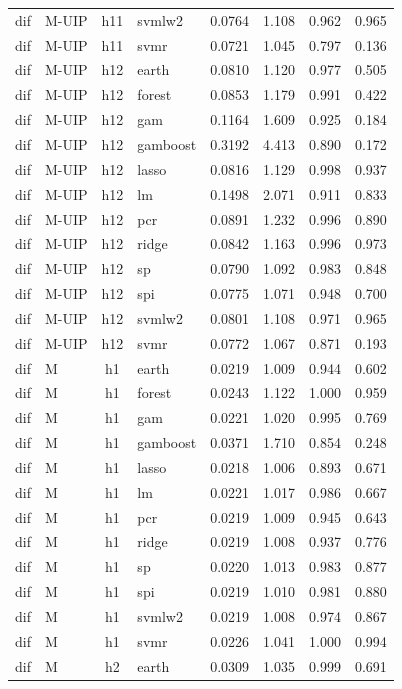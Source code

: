 \begin{ThreePartTable}
\begin{longtable}[t]{llclcccc}
dif & M-UIP & h11 & svmlw2 & 0.0764 & 1.108 & 0.962 & 0.965\\
dif & M-UIP & h11 & svmr & 0.0721 & 1.045 & 0.797 & 0.136\\
\addlinespace
dif & M-UIP & h12 & earth & 0.0810 & 1.120 & 0.977 & 0.505\\
dif & M-UIP & h12 & forest & 0.0853 & 1.179 & 0.991 & 0.422\\
dif & M-UIP & h12 & gam & 0.1164 & 1.609 & 0.925 & 0.184\\
dif & M-UIP & h12 & gamboost & 0.3192 & 4.413 & 0.890 & 0.172\\
dif & M-UIP & h12 & lasso & 0.0816 & 1.129 & 0.998 & 0.937\\
dif & M-UIP & h12 & lm & 0.1498 & 2.071 & 0.911 & 0.833\\
dif & M-UIP & h12 & pcr & 0.0891 & 1.232 & 0.996 & 0.890\\
dif & M-UIP & h12 & ridge & 0.0842 & 1.163 & 0.996 & 0.973\\
dif & M-UIP & h12 & sp & 0.0790 & 1.092 & 0.983 & 0.848\\
dif & M-UIP & h12 & spi & 0.0775 & 1.071 & 0.948 & 0.700\\
dif & M-UIP & h12 & svmlw2 & 0.0801 & 1.108 & 0.971 & 0.965\\
dif & M-UIP & h12 & svmr & 0.0772 & 1.067 & 0.871 & 0.193\\
\addlinespace
dif & M & h1 & earth & 0.0219 & 1.009 & 0.944 & 0.602\\
dif & M & h1 & forest & 0.0243 & 1.122 & 1.000 & 0.959\\
dif & M & h1 & gam & 0.0221 & 1.020 & 0.995 & 0.769\\
dif & M & h1 & gamboost & 0.0371 & 1.710 & 0.854 & 0.248\\
dif & M & h1 & lasso & 0.0218 & 1.006 & 0.893 & 0.671\\
dif & M & h1 & lm & 0.0221 & 1.017 & 0.986 & 0.667\\
dif & M & h1 & pcr & 0.0219 & 1.009 & 0.945 & 0.643\\
dif & M & h1 & ridge & 0.0219 & 1.008 & 0.937 & 0.776\\
dif & M & h1 & sp & 0.0220 & 1.013 & 0.983 & 0.877\\
dif & M & h1 & spi & 0.0219 & 1.010 & 0.981 & 0.880\\
dif & M & h1 & svmlw2 & 0.0219 & 1.008 & 0.974 & 0.867\\
dif & M & h1 & svmr & 0.0226 & 1.041 & 1.000 & 0.994\\
\addlinespace
dif & M & h2 & earth & 0.0309 & 1.035 & 0.999 & 0.691\\

\end{longtable}
\end{ThreePartTable}
